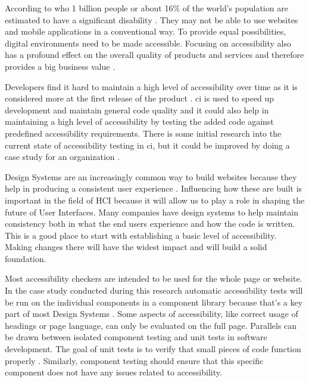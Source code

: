 \documentclass{master_thesis}
\begin{document}

According to \ac{who} 1 billion people or about 16\% of the world's population are estimated to have a significant disability \citep{WHO2022}. They may not be able to use websites and mobile applications in a conventional way. To provide equal possibilities, digital environments need to be made accessible. Focusing on accessibility also has a profound effect on the overall quality of products and services and therefore provides a big business value \citep{Miesenberger2020}.

Developers find it hard to maintain a high level of accessibility over time as it is considered more at the first release of the product \citep{Paterno2020}. \ac{ci} is used to speed up development and maintain general code quality \citep{Zhao2017} and it could also help in maintaining a high level of accessibility by testing the added code against predefined accessibility requirements. There is some initial research into the current state of accessibility testing in \ac{ci}, but it could be improved by doing a case study for an organization \citep{Sane2021, KelseyAdkins2022}.

Design Systems are an increasingly common way to build websites because they help in producing a consistent user experience \citep{Yew2020}. Influencing how these are built is important in the field of HCI because it will allow us to play a role in shaping the future of User Interfaces. Many companies have design systems to help maintain consistency both in what the end users experience and how the code is written. This is a good place to start with establishing a basic level of accessibility. Making changes there will have the widest impact and will build a solid foundation.

Most accessibility checkers are intended to be used for the whole page or website. In the case study conducted during this research automatic accessibility tests will be run on the individual components in a component library because that's a key part of most Design Systems \citep{Yew2020}. Some aspects of accessibility, like correct usage of headings or page language, can only be evaluated on the full page. Parallels can be drawn between isolated component testing and unit tests in software development. The goal of unit tests is to verify that small pieces of code function properly \citep[p.60]{Humble2010}. Similarly, component testing should ensure that this specific component does not have any issues related to accessibility.
\end{document}
